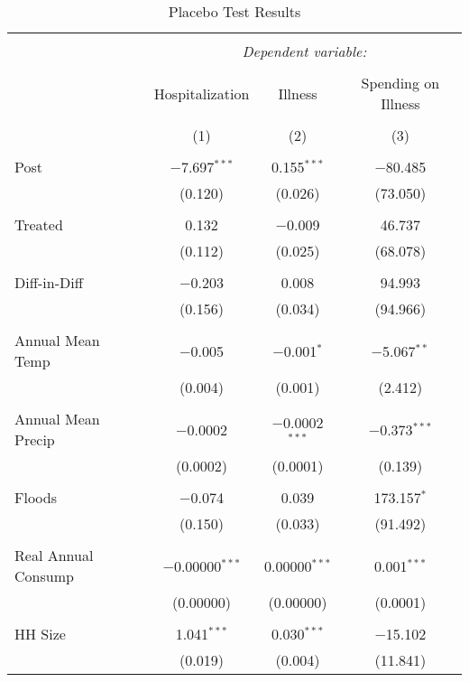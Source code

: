 
\begin{table}[!htbp] \centering 
  \caption{Placebo Test Results} 
  \label{} 
\begin{tabular}{@{\extracolsep{5pt}}lccc} 
\\[-1.8ex]\hline 
\hline \\[-1.8ex] 
 & \multicolumn{3}{c}{\textit{Dependent variable:}} \\ 
\cline{2-4} 
\\[-1.8ex] & Hospitalization & Illness & Spending on Illness \\ 
\\[-1.8ex] & (1) & (2) & (3)\\ 
\hline \\[-1.8ex] 
 Post & $-$7.697$^{***}$ & 0.155$^{***}$ & $-$80.485 \\ 
  & (0.120) & (0.026) & (73.050) \\ 
  & & & \\ 
 Treated & 0.132 & $-$0.009 & 46.737 \\ 
  & (0.112) & (0.025) & (68.078) \\ 
  & & & \\ 
 Diff-in-Diff & $-$0.203 & 0.008 & 94.993 \\ 
  & (0.156) & (0.034) & (94.966) \\ 
  & & & \\ 
 Annual Mean Temp & $-$0.005 & $-$0.001$^{*}$ & $-$5.067$^{**}$ \\ 
  & (0.004) & (0.001) & (2.412) \\ 
  & & & \\ 
 Annual Mean Precip & $-$0.0002 & $-$0.0002$^{***}$ & $-$0.373$^{***}$ \\ 
  & (0.0002) & (0.0001) & (0.139) \\ 
  & & & \\ 
 Floods & $-$0.074 & 0.039 & 173.157$^{*}$ \\ 
  & (0.150) & (0.033) & (91.492) \\ 
  & & & \\ 
 Real Annual Consump & $-$0.00000$^{***}$ & 0.00000$^{***}$ & 0.001$^{***}$ \\ 
  & (0.00000) & (0.00000) & (0.0001) \\ 
  & & & \\ 
 HH Size & 1.041$^{***}$ & 0.030$^{***}$ & $-$15.102 \\ 
  & (0.019) & (0.004) & (11.841) \\ 

\end{tabular}
\end{table}
